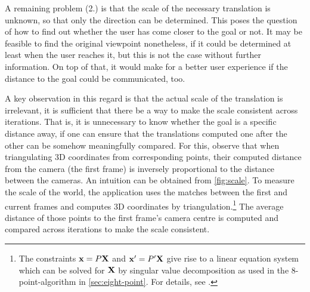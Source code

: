 A remaining problem (2.) is that the scale of the necessary translation is
unknown, so that only the direction can be determined. This poses the question
of how to find out whether the user has come closer to the goal or not. It may
be feasible to find the original viewpoint nonetheless, if it could be
determined at least when the user reaches it, but this is not the case without
further information. On top of that, it would make for a better user experience
if the distance to the goal could be communicated, too.

A key observation in this regard is that the actual scale of the translation is
irrelevant, it is sufficient that there be a way to make the scale consistent
across iterations. That is, it is unnecessary to know whether the goal is a
specific distance away, if one can ensure that the translations computed one
after the other can be somehow meaningfully compared. For this, \citet{bae2010}
observe that when triangulating 3D coordinates from corresponding points, their
computed distance from the camera (the first frame) is inversely proportional
to the distance between the cameras. An intuition can be obtained from
\autoref{fig:scale}. To measure the scale of the world, the application uses the
matches between the first and current frames and computes 3D coordinates by
triangulation.\footnote{The constraints $\mathbf{x} = P\mathbf{X}$ and $\mathbf{x}^\prime =
P^\prime\mathbf{X}$ give rise to a linear equation system which can be solved for
$\mathbf{X}$ by singular value decomposition as used in the 8-point-algorithm in \autoref{sec:eight-point}.
For details, see \citep[ch. 12.2]{h&z2004}.} The
average distance of those points to the first frame's camera centre is computed
and compared across iterations to make the scale consistent.

